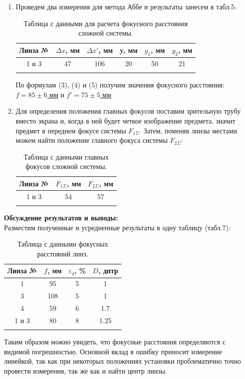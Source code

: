 \documentclass[a4paper, 12pt]{article}%
\begin{document}
	\begin{enumerate}
	\item Проведем два измерения для метода Аббе и результаты занесем в табл.5:
	
	\begin{longtable}{|c|c|c|c|c|c|}
		\hline
		Линза №&$\Delta x$, мм & $\Delta x'$, мм & y, мм & $y_1$, мм & $y_2$, мм \\ \hline
		1 и 3 & 47 & 106 & 20 & 50 & 21 \\ \hline
		\caption{Таблица с данными для расчета фокусного расстояния сложной системы.}
	\end{longtable}


По формулам (3), (4) и (5) получим значения фокусного расстояния: \underline{$f = 85 \pm 6$ мм}  и \underline{$f' = 75 \pm 5$ мм}\\

\item Для определения положения главных фокусов поставим зрительную трубу вместо экрана и, когда в ней будет четкое изображение предмета, значит предмет в переднем фокусе системы $F_{1 \Sigma}$. Затем, поменяв линзы местами можем найти положение главного фокуса системы $F_{2 \Sigma}$:

\begin{longtable}{|c|c|c|}
	\hline
	Линза №&$F_{1 \Sigma}$, мм & $F_{2 \Sigma}$, мм  \\ \hline
	1 и 3 & 54 & 57 \\ \hline
	\caption{Таблица с данными главных фокусов сложной системы.}
\end{longtable}
 
\end{enumerate}
	\textbf{Обсуждение результатов и выводы: }\\
	
	Разместим полученные и усредненные результаты в одну таблицу (табл.7):
	
	\begin{longtable}{|c|c|c|c|}
		\hline
		Линза №&$f$, мм &  $\varepsilon _{э}$, \% & $D$, дптр\\ \hline
		1 & 95 & 5&  1\\ \hline
		3 & 108 & 5& 1 \\ \hline
		4 & 59 & 6& 1.7 \\ \hline
		1 и 3 & 80 & 8& 1.25 \\ \hline
		\caption{Таблица с данными фокусных расстояний линз.}
	\end{longtable}
	
	Таким образом можно увидеть, что фокусные расстояния определяются с видимой погрешностью. Основной вклад в ошибку приносит измерение линейкой, так как при некоторых положениях установки проблематично точно провести измерения, так же как и найти центр линзы.

	
\end{document}
